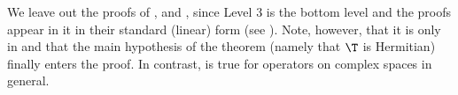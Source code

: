 \documentclass[10pt,oneside]{scrreprt}
\begin{document}
\elevator
We leave out the proofs of ,  and , 
since Level 3 is the bottom level and the proofs appear in it in their standard (linear) form (see ). 
Note, however, that it is only in  and  
that the main hypothesis of the theorem (namely that $\T$ is Hermitian) finally enters the proof.
In contrast,  is true for operators on complex spaces in general.
  
  
\roomservice
\begin{treedef}
\end{treedef}



\end{document}
